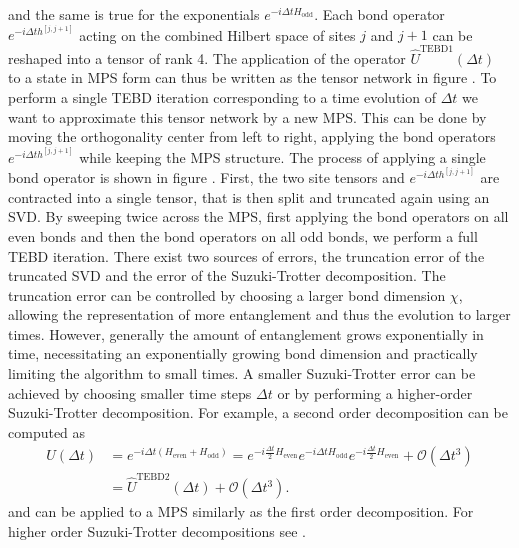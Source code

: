 and the same is true for the exponentials $e^{-i\Delta tH_\text{odd}}$. Each bond operator $e^{-i\Delta t h^{[j, j+1]}}$ acting on the combined Hilbert space of sites $j$ and $j+1$ can be reshaped into a tensor of rank 4. The application of the operator $\hat{U}^\text{TEBD1}(\Delta t)$ to a state in MPS form can thus be written as the tensor network in figure .
To perform a single TEBD iteration corresponding to a time evolution of $\Delta t$ we want to approximate this tensor network by a new MPS. This can be done by moving the orthogonality center from left to right, applying the bond operators $e^{-i\Delta t h^{[j, j+1]}}$ while keeping the MPS structure. The process of applying a single bond operator is shown in figure . First, the two site tensors and $e^{-i\Delta t h^{[j, j+1]}}$  are contracted into a single tensor, that is then split and truncated again using an SVD. By sweeping twice across the MPS, first applying the bond operators on all even bonds and then the bond operators on all odd bonds, we perform a full TEBD iteration. There exist two sources of errors, the truncation error of the truncated SVD and the error of the Suzuki-Trotter decomposition. The truncation error can be controlled by choosing a larger bond dimension $\chi$, allowing the representation of more entanglement and thus the evolution to larger times. However, generally the amount of entanglement grows exponentially in time, necessitating an exponentially growing bond dimension and practically limiting the algorithm to small times. A smaller Suzuki-Trotter error can be achieved by choosing smaller time steps $\Delta t$ or by performing a higher-order Suzuki-Trotter decomposition. For example, a second order decomposition can be computed as
\begin{equation}
	\begin{split}
		U(\Delta t) &= e^{-i\Delta t\left(H_\text{even} + H_\text{odd}\right)} = e^{-i\frac{\Delta t}{2}H_\text{even}} e^{-i\Delta t H_\text{odd}} e^{-i\frac{\Delta t}{2}H_\text{even}} + \mathcal{O}\left(\Delta t^3\right)\\
		&= \hat{U}^\text{TEBD2}(\Delta t) + \mathcal{O}\left(\Delta t^3\right).
	\end{split}
\end{equation}
and can be applied to a MPS similarly as the first order decomposition. For higher order Suzuki-Trotter decompositions see \cite{cite:finding_exponential_product_formulas_of_higher_orders}.

